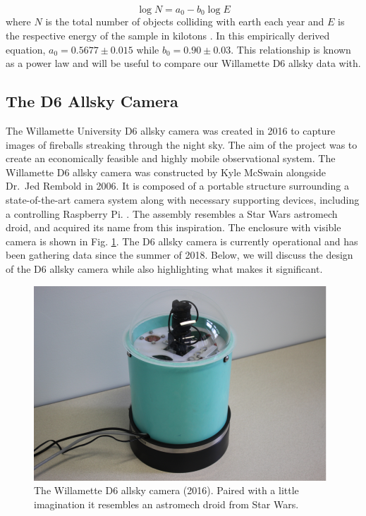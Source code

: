 \begin{equation}
\log N = a_0 - b_0\log E
\label{eq:browneq}
\end{equation}
where $N$ is the total number of objects colliding with earth each year and $E$ is the respective energy of the sample in kilotons \cite{brown_p_flux_2002}.
In this empirically derived equation, $a_0 = 0.5677 \pm 0.015$ while $b_0 = 0.90 \pm 0.03$.
This relationship is known as a power law and will be useful to compare our Willamette D6 allsky data with.




\subsection{The D6 Allsky Camera}

The Willamette University D6 allsky camera was created in 2016 to capture images of fireballs streaking through the night sky.
The aim of the project was to create an economically feasible and highly mobile observational system.
The Willamette D6 allsky camera was constructed by Kyle McSwain alongside Dr.\ Jed Rembold in 2006.
It is composed of a portable structure surrounding a state-of-the-art camera system along with necessary supporting devices, including a controlling Raspberry Pi. \cite{mcswain_using_2016}.
The assembly resembles a Star Wars astromech droid, and acquired its name from this inspiration.
The enclosure with visible camera is shown in Fig. \ref{droid}.
The D6 allsky camera is currently operational and has been gathering data since the summer of 2018.  
Below, we will discuss the design of the D6 allsky camera while also highlighting what makes it significant.

\begin{figure}[ht!]
  \centering
  \includegraphics[scale=0.7]{images/allsky_camera.png}
  \caption{The Willamette D6 allsky camera (2016). Paired with a little imagination it resembles an astromech droid from Star Wars.}
  \label{droid}
\end{figure}


